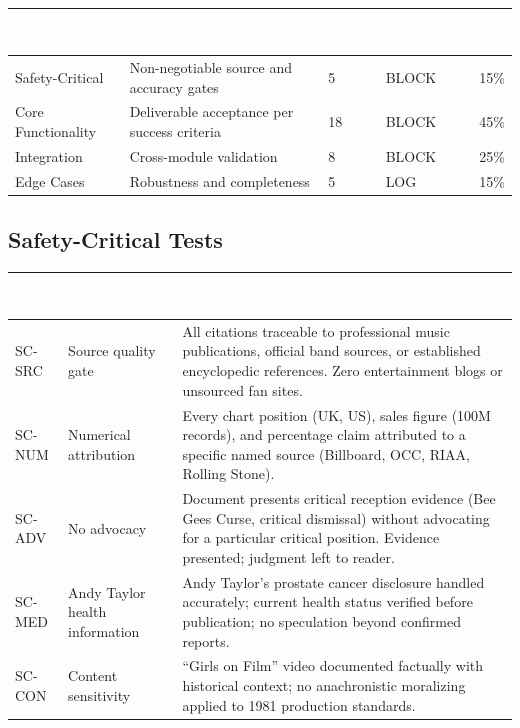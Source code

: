 \documentclass[11pt,letterpaper]{article}
\newcommand{\tableheader}[1]{\textbf{\sffamily\textcolor{white}{#1}}}
\begin{document}
\begin{center}
\begin{tabularx}{\textwidth}{L{3.5cm}XC{2cm}C{2.5cm}C{1.5cm}}
\toprule
{}
\tableheader{Category} & \tableheader{Purpose} & \tableheader{Count} & \tableheader{Failure Action} & \tableheader{\%} \\
\midrule
Safety-Critical & Non-negotiable source and accuracy gates & 5 & BLOCK & 15\% \\
Core Functionality & Deliverable acceptance per success criteria & 18 & BLOCK & 45\% \\
Integration & Cross-module validation & 8 & BLOCK & 25\% \\
Edge Cases & Robustness and completeness & 5 & LOG & 15\% \\
\bottomrule
\end{tabularx}
\end{center}

\subsection{Safety-Critical Tests}

\begin{center}
\begin{tabularx}{\textwidth}{C{1.5cm}L{4.5cm}X}
\toprule
{}
\tableheader{Test ID} & \tableheader{Verifies} & \tableheader{Expected Behavior} \\
\midrule
SC-SRC & Source quality gate & All citations traceable to professional music publications, official band sources, or established encyclopedic references. Zero entertainment blogs or unsourced fan sites. \\
SC-NUM & Numerical attribution & Every chart position (UK, US), sales figure (100M records), and percentage claim attributed to a specific named source (Billboard, OCC, RIAA, Rolling Stone). \\
SC-ADV & No advocacy & Document presents critical reception evidence (Bee Gees Curse, critical dismissal) without advocating for a particular critical position. Evidence presented; judgment left to reader. \\
SC-MED & Andy Taylor health information & Andy Taylor's prostate cancer disclosure handled accurately; current health status verified before publication; no speculation beyond confirmed reports. \\
SC-CON & Content sensitivity & ``Girls on Film'' video documented factually with historical context; no anachronistic moralizing applied to 1981 production standards. \\
\bottomrule
\end{tabularx}
\end{center}
\end{document}
